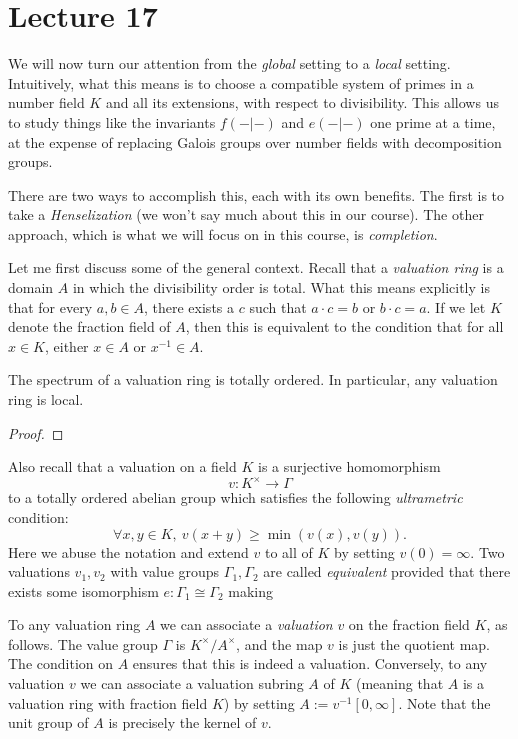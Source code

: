 \section{Lecture 17}

We will now turn our attention from the \emph{global} setting to a \emph{local} setting.
Intuitively, what this means is to choose a compatible system of primes in a number field $K$ and all its extensions, with respect to divisibility.
This allows us to study things like the invariants $f(-|-)$ and $e(-|-)$ one prime at a time, at the expense of replacing Galois groups over number fields with decomposition groups.

There are two ways to accomplish this, each with its own benefits.
The first is to take a \emph{Henselization} (we won't say much about this in our course).
The other approach, which is what we will focus on in this course, is \emph{completion}.

Let me first discuss some of the general context.
Recall that a \emph{valuation ring} is a domain $A$ in which the divisibility order is total.
What this means explicitly is that for every $a,b \in A$, there exists a $c$ such that $a \cdot c = b$ or $b \cdot c = a$.
If we let $K$ denote the fraction field of $A$, then this is equivalent to the condition that for all $x \in K$, either $x \in A$ or $x^{-1} \in A$.

\begin{lemma}
  The spectrum of a valuation ring is totally ordered.
  In particular, any valuation ring is local.
\end{lemma}
\begin{proof}
\end{proof}

Also recall that a valuation on a field $K$ is a surjective homomorphism
\[ v : K^{\times} \to \Gamma \]
to a totally ordered abelian group which satisfies the following \emph{ultrametric} condition:
\[ \forall x,y \in K, \ v(x+y) \geq \min(v(x),v(y)). \]
Here we abuse the notation and extend $v$ to all of $K$ by setting $v(0) = \infty$.
Two valuations $v_{1},v_{2}$ with value groups $\Gamma_{1},\Gamma_{2}$ are called \emph{equivalent} provided that there exists some isomorphism $e : \Gamma_{1} \cong \Gamma_{2}$ making 

To any valuation ring $A$ we can associate a \emph{valuation} $v$ on the fraction field $K$, as follows.
The value group $\Gamma$ is $K^{\times}/A^{\times}$, and the map $v$ is just the quotient map.
The condition on $A$ ensures that this is indeed a valuation.
Conversely, to any valuation $v$ we can associate a valuation subring $A$ of $K$ (meaning that $A$ is a valuation ring with fraction field $K$) by setting $A := v^{-1}[0,\infty]$.
Note that the unit group of $A$ is precisely the kernel of $v$.

